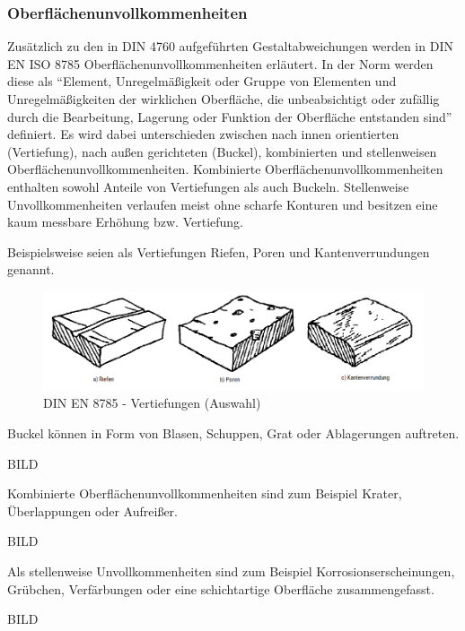 \subsubsection{Oberflächenunvollkommenheiten}

Zusätzlich zu den in DIN 4760 aufgeführten Gestaltabweichungen werden in DIN EN ISO 8785 Oberflächenunvollkommenheiten erläutert. In der Norm werden diese als "`Element, Unregelmäßigkeit oder Gruppe von Elementen und Unregelmäßigkeiten der wirklichen Oberfläche, die unbeabsichtigt oder zufällig durch die Bearbeitung, Lagerung oder Funktion der Oberfläche entstanden sind"' definiert. Es wird dabei unterschieden zwischen nach innen orientierten (Vertiefung), nach außen gerichteten (Buckel), kombinierten und stellenweisen Oberflächenunvollkommenheiten. Kombinierte Oberflächenunvollkommenheiten enthalten sowohl Anteile von Vertiefungen als auch Buckeln. Stellenweise Unvollkommenheiten verlaufen meist ohne scharfe Konturen und besitzen eine kaum messbare Erhöhung bzw. Vertiefung. 

Beispielsweise seien als Vertiefungen Riefen, Poren und Kantenverrundungen genannt. 

\begin{figure}[h]
	\centering
	\includegraphics[width=0.7\linewidth]{img/din8785_vertiefung}
	\caption[DIN 8785 - Vertiefungen (Auswahl)]{DIN EN 8785 - Vertiefungen (Auswahl)}
	\label{fig:din8785_vertiefung}
\end{figure}


Buckel können in Form von Blasen, Schuppen, Grat oder Ablagerungen auftreten. 

BILD

Kombinierte Oberflächenunvollkommenheiten sind zum Beispiel Krater, Überlappungen oder Aufreißer.

BILD

Als stellenweise Unvollkommenheiten sind zum Beispiel Korrosionserscheinungen, Grübchen, Verfärbungen oder eine schichtartige Oberfläche zusammengefasst. 

BILD    

   
              

 






 






          


